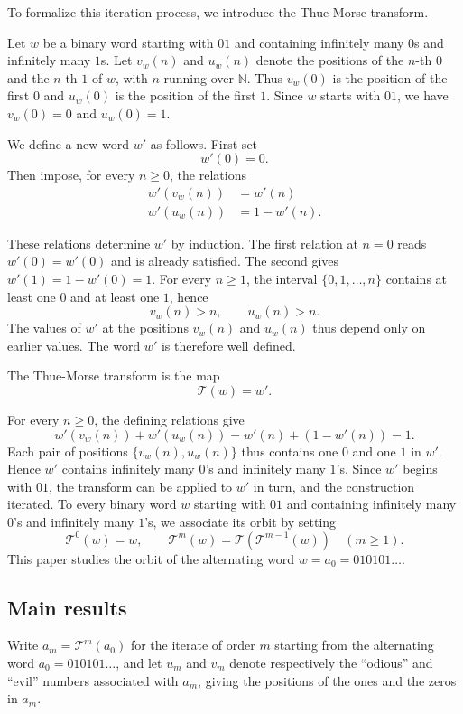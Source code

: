 \documentclass[12pt,reqno]{article}
\newcommand{\N}{\mathbb{N}}
\theoremstyle{plain}
\theoremstyle{definition}
\begin{document}
To formalize this iteration process, we introduce the Thue-Morse transform.

Let $w$ be a binary word starting with $01$ and containing infinitely many $0$s and infinitely many $1$s. Let $v_w(n)$ and $u_w(n)$ denote the positions of the $n$-th $0$ and the $n$-th $1$ of $w$, with $n$ running over $\N$. Thus $v_w(0)$ is the position of the first $0$ and $u_w(0)$ is the position of the first $1$. Since $w$ starts with $01$, we have $v_w(0) = 0$ and $u_w(0) = 1$.

We define a new word $w'$ as follows. First set
\[
  w'(0) = 0.
\]
Then impose, for every $n \ge 0$, the relations
\begin{align*}
  w'(v_w(n)) &= w'(n) \\
  w'(u_w(n)) &= 1 - w'(n).
\end{align*}

These relations determine $w'$ by induction. The first relation at $n = 0$ reads $w'(0) = w'(0)$ and is already satisfied. The second gives $w'(1) = 1 - w'(0) = 1$. For every $n \ge 1$, the interval $\{0, 1, \ldots, n\}$ contains at least one $0$ and at least one $1$, hence
\[
  v_w(n) > n, \qquad u_w(n) > n.
\]
The values of $w'$ at the positions $v_w(n)$ and $u_w(n)$ thus depend only on earlier values. The word $w'$ is therefore well defined.

The Thue-Morse transform is the map
\[
  \mathcal{T}(w) = w'.
\]

For every $n \ge 0$, the defining relations give
\[
  w'(v_w(n)) + w'(u_w(n)) = w'(n) + (1 - w'(n)) = 1.
\]
Each pair of positions $\{v_w(n), u_w(n)\}$ thus contains one $0$ and one $1$ in $w'$. Hence $w'$ contains infinitely many $0$'s and infinitely many $1$'s. Since $w'$ begins with $01$, the transform can be applied to $w'$ in turn, and the construction iterated. To every binary word $w$ starting with $01$ and containing infinitely many $0$'s and infinitely many $1$'s, we associate its orbit by setting
\[
  \mathcal{T}^0(w)=w,\qquad
  \mathcal{T}^m(w)=\mathcal{T}(\mathcal{T}^{m-1}(w))\quad(m\ge1).
\]
This paper studies the orbit of the alternating word $w = a_0 = 010101\dots$.

\subsection*{Main results}

Write $a_m = \mathcal{T}^m(a_0)$ for the iterate of order $m$ starting from the alternating word $a_0 = 010101\dots$, and let $u_m$ and $v_m$ denote respectively the ``odious'' and ``evil'' numbers associated with $a_m$, giving the positions of the ones and the zeros in $a_m$.
\end{document}
